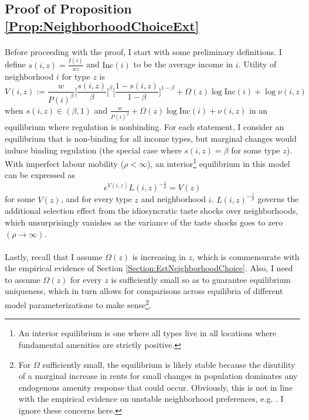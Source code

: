 \documentclass[12pt]{article}
\begin{document}
	\clearpage
	\subsection{Proof of Proposition \ref{Prop:NeighborhoodChoiceExt}}\label{Proof:NeighborhoodChoiceExt}
	
	\paragraph*{}
	Before proceeding with the proof, I start with some preliminary definitions. I define $s(i, z) = \frac{I(i)}{wz}$ and $\text{Inc}(i)$ to be the average income in $i$. Utility of neighborhood $i$ for type $z$ is $$V(i, z) := \frac{w}{P(i)^{\beta}}\bigg[\frac{s(i, z)}{\beta}\bigg]^{\beta}\bigg[\frac{1 - s(i, z)}{1 - \beta}\bigg]^{1 - \beta} + \Omega(z)\log \text{Inc}(i) + \log \nu(i, z)$$ when $s(i, z) \in (\beta, 1)$ and $\frac{w}{P(i)^{\beta}} + \Omega(z)\log \text{Inc}(i) + \nu(i, z)$ in an equilibrium where regulation is nonbinding. For each statement, I consider an equilibrium that is non-binding for all income types, but marginal changes would induce binding regulation (the special case where $s(i, z) = \beta$ for some type $z$). With imperfect labour mobility ($\rho < \infty$), an interior\footnote{An interior equilibrium is one where all types live in all locations where fundamental amenities are strictly positive. } equilibrium in this model can be expressed as 
	\begin{equation}\label{AppendixEq:EquilibriumPropNCE}
		e^{V(i, z)}L(i, z)^{-\frac{1}{\rho}} = V(z)
	\end{equation}
	for some $V(z)$, and for every type $z$ and neighborhood $i$. $L(i, z)^{-\frac{1}{\rho}}$ governs the additional selection effect from the idiosyncratic taste shocks over neighborhoods, which unsurprisingly vanishes as the variance of the taste shocks goes to zero $(\rho \to \infty)$. 
	
	\paragraph*{}
	Lastly, recall that I assume $\Omega(z)$ is increasing in $z$, which is commensurate with the empirical evidence of Section \ref{Section:EstNeighborhoodChoice}. Also, I need to assume $\Omega(z)$ for every $z$ is sufficiently small so as to guarantee equilibrium uniqueness, which in turn allows for comparisons across equilibria of different model parameterizations to make sense\footnote{For $\Omega$ sufficiently small, the equilibrium is likely stable because the disutility of a marginal increase in rents for small changes in population dominates any endogenous amenity response that could occur. Obviously, this is not in line with the empirical evidence on unstable neighborhood preferences, e.g. \citep{davisetalracepref}. I ignore these concerns here.}.
	
\end{document}
